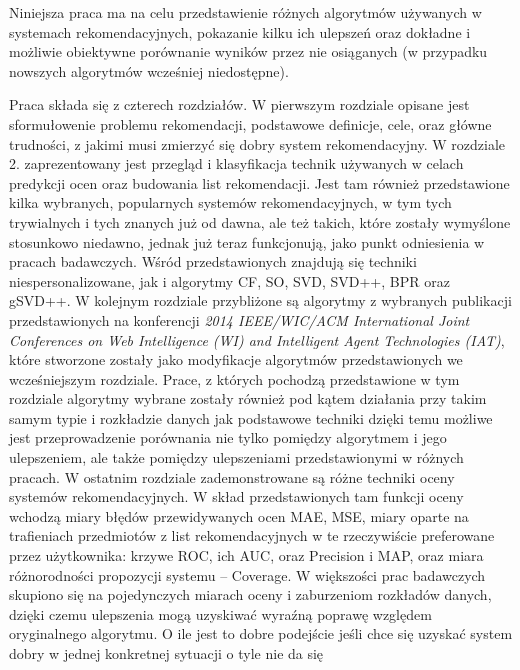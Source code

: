 \documentclass{pracamgr}
\begin{document}
  Niniejsza praca ma na celu przedstawienie różnych algorytmów używanych w systemach rekomendacyjnych, pokazanie kilku ich ulepszeń oraz
  dokładne i możliwie obiektywne porównanie wyników przez nie osiąganych (w przypadku nowszych algorytmów wcześniej niedostępne).\newline
 
  Praca składa się z czterech rozdziałów. W pierwszym rozdziale opisane jest sformułowenie problemu rekomendacji,
  podstawowe definicje, cele, oraz główne trudności, z jakimi musi zmierzyć się dobry system rekomendacyjny.
  W rozdziale 2. zaprezentowany jest przegląd i klasyfikacja technik używanych w celach predykcji ocen oraz budowania list rekomendacji.\newline
  Jest tam również przedstawione kilka wybranych, popularnych systemów rekomendacyjnych, w tym tych trywialnych
  i tych znanych już od dawna, ale też takich, które zostały wymyślone stosunkowo niedawno, jednak już teraz funkcjonują,
  jako punkt odniesienia w pracach badawczych. Wśród przedstawionych znajdują się techniki niespersonalizowane, jak i algorytmy CF, SO, SVD, SVD++,
  BPR oraz gSVD++.\newline
  W kolejnym rozdziale przybliżone są algorytmy z wybranych publikacji przedstawionych na konferencji
  \textit{2014 IEEE/WIC/ACM International Joint Conferences on Web Intelligence (WI) and Intelligent Agent Technologies (IAT)}, 
  które stworzone zostały jako modyfikacje algorytmów przedstawionych we wcześniejszym rozdziale. Prace, z których pochodzą
  przedstawione w tym rozdziale algorytmy wybrane zostały również pod kątem działania przy takim samym typie i rozkładzie danych jak podstawowe techniki
  dzięki temu możliwe jest przeprowadzenie porównania nie tylko pomiędzy algorytmem i jego ulepszeniem, ale także pomiędzy ulepszeniami
  przedstawionymi w różnych pracach.\newline
  W ostatnim rozdziale zademonstrowane są różne techniki oceny systemów rekomendacyjnych.
  W skład przedstawionych tam funkcji oceny wchodzą miary błędów przewidywanych ocen MAE, MSE,
  miary oparte na trafieniach przedmiotów z list rekomendacyjnych w te rzeczywiście preferowane przez użytkownika:
  krzywe ROC, ich AUC, oraz Precision i MAP, oraz miara różnorodności propozycji systemu -- Coverage.
  W większości prac badawczych skupiono się na pojedynczych miarach oceny i zaburzeniom rozkładów danych,
  dzięki czemu ulepszenia mogą uzyskiwać wyraźną poprawę względem oryginalnego algorytmu.
  O ile jest to dobre podejście jeśli chce się uzyskać system dobry w jednej konkretnej sytuacji o tyle nie da się
\end{document}
